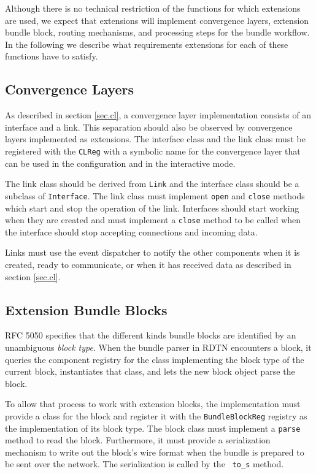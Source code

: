 \documentclass[a4paper]{article}
\begin{document}
Although there is no technical restriction of the functions for which extensions
are used, we expect that extensions will implement convergence layers,
extension bundle block, routing mechanisms, and processing steps for the bundle
workflow. In the following we describe what requirements extensions for each of
these functions have to satisfy.

\subsection{Convergence Layers}\label{sec.ext.cls}

As described in section \ref{sec.cl}, a convergence layer implementation
consists of an interface and a link. This separation should also be observed by
convergence layers implemented as extensions. The interface class and the link
class must be registered with the {\tt CLReg} with a symbolic name for the
convergence layer that can be used in the configuration and in the interactive
mode.

The link class should be derived from {\tt Link} and the interface class should
be a subclass of {\tt Interface}.  The link class must implement {\tt open} and
{\tt close} methods which start and stop the operation of the link. Interfaces
should start working when they are created and must implement a {\tt close}
method to be called when the interface should stop accepting connections and
incoming data.

Links must use the event dispatcher to notify the other components when it is
created, ready to communicate, or when it has received data as described in
section \ref{sec.cl}.

\subsection{Extension Bundle Blocks}\label{sec.ext.blocks}

RFC 5050 \cite{bundle-spec} specifies that the different kinds bundle blocks are
identified by an unambiguous {\em block type}. When the bundle parser in RDTN
encounters a block, it queries the component registry for the class implementing
the block type of the current block, instantiates that class, and lets the new
block object parse the block.

To allow that process to work with extension blocks, the implementation must
provide a class for the block and register it with the {\tt BundleBlockReg}
registry as the implementation of its block type. The block class must implement
a {\tt parse} method to read the block. Furthermore, it must provide a
serialization mechanism to write out the block's wire format when the bundle is
prepared to be sent over the network. The serialization is called by the {\tt
to\_s} method.
\end{document}
